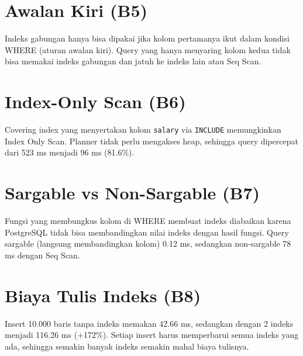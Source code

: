 \section{Awalan Kiri (B5)}
Indeks gabungan hanya bisa dipakai jika kolom pertamanya ikut dalam kondisi WHERE (aturan awalan kiri). Query yang hanya menyaring kolom kedua tidak bisa memakai indeks gabungan dan jatuh ke indeks lain atau Seq Scan.


\section{Index-Only Scan (B6)}
Covering index yang menyertakan kolom \texttt{salary} via \texttt{INCLUDE} memungkinkan Index Only Scan. Planner tidak perlu mengakses heap, sehingga query dipercepat dari 523 ms menjadi 96 ms (81.6\%).


\section{Sargable vs Non-Sargable (B7)}
Fungsi yang membungkus kolom di WHERE membuat indeks diabaikan karena PostgreSQL tidak bisa membandingkan nilai indeks dengan hasil fungsi. Query sargable (langsung membandingkan kolom) 0.12 ms, sedangkan non-sargable 78 ms dengan Seq Scan.


\section{Biaya Tulis Indeks (B8)}
Insert 10.000 baris tanpa indeks memakan 42.66 ms, sedangkan dengan 2 indeks menjadi 116.26 ms (+172\%). Setiap insert harus memperbarui semua indeks yang ada, sehingga semakin banyak indeks semakin mahal biaya tulisnya.

